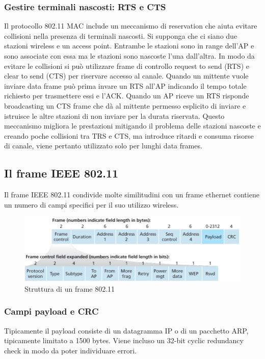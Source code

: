 \subsubsection{Gestire terminali nascosti: RTS e CTS}
Il protocollo 802.11 MAC include un meccanismo di reservation che aiuta evitare collisioni nella presenza di terminali nascosti. Si supponga che ci siano due stazioni wireless e un access point. Entrambe le
stazioni sono in range dell'AP e sono associate con essa ma le stazioni sono nascoste l'una dall'altra. In modo da evitare le collisioni si pu\`o utilizzare frame di controllo request to send (RTS) e clear to send 
(CTS) per riservare accesso al canale. Quando un mittente vuole inviare data frame pu\`o prima invare un RTS all'AP indicando il tempo totale richiesto per trasmettere essi e l'ACK. Quando un AP riceve un RTS
risponde broadcasting un CTS frame che d\`a al mittente permesso esplicito di inviare e istruisce le altre stazioni di non inviare per la durata riservata. Questo meccanismo migliora le prestazioni mitigando il 
problema delle stazioni nascoste e creando poche collisioni tra TRS e CTS, ma introduce ritardi e consuma risorse di canale, viene pertanto utilizzato solo per lunghi data frames. 
\subsection{Il frame IEEE 802.11}
Il frame IEEE 802.11 condivide molte similitudini con un frame ethernet contiene un numero di campi specifici per il suo utilizzo wireless.
\begin{figure}[h]
\includegraphics[width=\textwidth]{Frame80211.png}
\caption{Struttura di un frame 802.11}
\end{figure}
\subsubsection{Campi payload e CRC}
Tipicamente il payload consiste di un datagramma IP o di un pacchetto ARP, tipicamente limitato a 1500 bytes. Viene incluso un 32-bit cyclic redundancy check in modo da poter individuare errori. 
